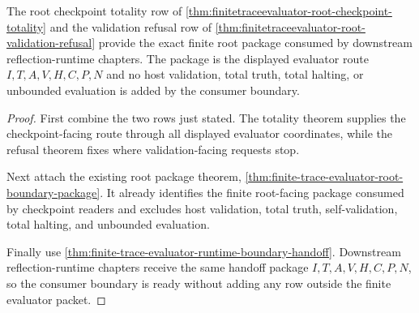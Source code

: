 \begin{theorem}
\label{thm:finitetraceevaluator-root-consumer-readiness}
The root checkpoint totality row of
\autoref{thm:finitetraceevaluator-root-checkpoint-totality} and the validation
refusal row of \autoref{thm:finitetraceevaluator-root-validation-refusal}
provide the exact finite root package consumed by downstream
reflection-runtime chapters. The package is the displayed evaluator route
$I,T,A,V,H,C,P,N$ and no host validation, total truth, total halting, or
unbounded evaluation is added by the consumer boundary.
\end{theorem}
\begin{proof}
First combine the two rows just stated. The totality theorem supplies the
checkpoint-facing route through all displayed evaluator coordinates, while the
refusal theorem fixes where validation-facing requests stop.

Next attach the existing root package theorem,
\autoref{thm:finite-trace-evaluator-root-boundary-package}. It already
identifies the finite root-facing package consumed by checkpoint readers and
excludes host validation, total truth, self-validation, total halting, and
unbounded evaluation.

Finally use \autoref{thm:finite-trace-evaluator-runtime-boundary-handoff}.
Downstream reflection-runtime chapters receive the same handoff package
$I,T,A,V,H,C,P,N$, so the consumer boundary is ready without adding any row
outside the finite evaluator packet.
\end{proof}
